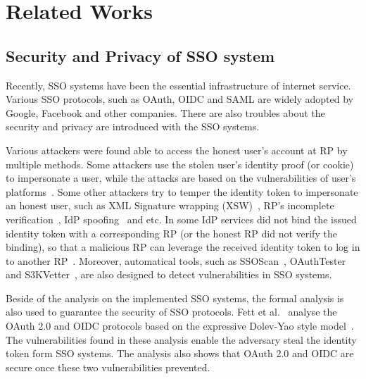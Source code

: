 \section{Related Works}
\label{sec:relatedwork}
\subsection{Security and Privacy of SSO system}
Recently, SSO systems have been the essential infrastructure of internet service. Various SSO protocols, such as OAuth, OIDC and SAML are  widely adopted by Google, Facebook and other companies. There are also troubles about the security and privacy are introduced with the SSO systems. 

Various attackers were found able to access the honest user's account at RP by multiple methods. 
Some attackers use the stolen user's identity proof (or cookie) to impersonate a user, while the attacks are based on the vulnerabilities of user's platforms~\cite{WangCW12,ArmandoCCCPS13}.
Some other attackers try to temper the identity token to impersonate an honest user, such as  XML Signature wrapping (XSW)~\cite{SomorovskyMSKJ12}, RP's incomplete verification~\cite{WangCW12,WangZLG16,MainkaMSW17}, IdP spoofing~\cite{MainkaMS16,MainkaMSW17} and etc. 
In some IdP services did not bind the issued identity token with a corresponding RP (or the honest RP did not verify the binding), so that a malicious RP can leverage the received identity token to log in to another RP~\cite{YangLCZ18,WangZLG16,MainkaMS16,MainkaMSW17,YangLCZ18}. 
Moreover, automatical tools, such as SSOScan~\cite{ZhouE14}, OAuthTester~\cite{YangLLZH16} and S3KVetter~\cite{YangLCZ18}, are also designed to detect vulnerabilities in SSO systems.

Beside of the analysis on the implemented SSO systems, the formal analysis is also used to guarantee the security of SSO protocols. Fett et al.~\cite{FettKS16, FettKS17} analyse the OAuth 2.0 and OIDC protocols based on the expressive Dolev-Yao style model~\cite{FettKS14}. The vulnerabilities found in these analysis enable the adversary steal the identity token form SSO systems. The analysis also shows that OAuth 2.0 and OIDC are secure once these two vulnerabilities prevented. 

